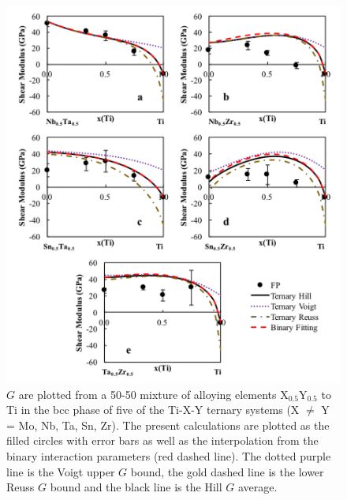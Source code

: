 \pagebreak
\begin{figure}[H]
	\centering
	\includegraphics[width=\textwidth]{Chapter-6/Figures/tixyshear2.png}
	\caption{$G$ are plotted from a 50-50 mixture of alloying elements X$_{0.5}$Y$_{0.5}$ to Ti in the bcc phase of five of the Ti-X-Y ternary systems (X $\neq$ Y = Mo, Nb, Ta, Sn, Zr). The present calculations are plotted as the filled circles with error bars as well as the interpolation from the binary interaction parameters (red dashed line). The dotted purple line is the Voigt upper $G$ bound, the gold dashed line is the lower Reuss $G$ bound and the black line is the Hill $G$ average.}
	\label{Ch6-figure:tixyshear2}
\end{figure}

